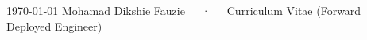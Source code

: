 \documentclass[11pt, a4paper]{awesome-cv}
\begin{document}
\makecvheader[C]

\makecvfooter
  {\today}
  {Mohamad Dikshie Fauzie~~~·~~~Curriculum Vitae (Forward Deployed Engineer)}
  {\thepage}





\newpage


\newpage




\end{document}
